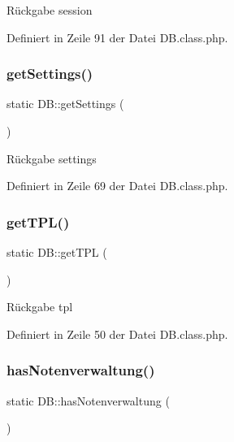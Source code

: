 \begin{DoxyReturn}{Rückgabe}
session 
\end{DoxyReturn}


Definiert in Zeile 91 der Datei D\+B.\+class.\+php.

\mbox{\label{class_d_b_a30c984e1dee257f1b9d3b62cbae0ac41}} 
\subsubsection{\texorpdfstring{get\+Settings()}{getSettings()}}
{\footnotesize\ttfamily static D\+B\+::get\+Settings (\begin{DoxyParamCaption}{ }\end{DoxyParamCaption})\hspace{0.3cm}{\ttfamily [static]}}

\begin{DoxyReturn}{Rückgabe}
settings 
\end{DoxyReturn}


Definiert in Zeile 69 der Datei D\+B.\+class.\+php.

\mbox{\label{class_d_b_a3b3f4c52a74bd43c8de64f37affdc13c}} 
\subsubsection{\texorpdfstring{get\+T\+P\+L()}{getTPL()}}
{\footnotesize\ttfamily static D\+B\+::get\+T\+PL (\begin{DoxyParamCaption}{ }\end{DoxyParamCaption})\hspace{0.3cm}{\ttfamily [static]}}

\begin{DoxyReturn}{Rückgabe}
tpl 
\end{DoxyReturn}


Definiert in Zeile 50 der Datei D\+B.\+class.\+php.

\mbox{\label{class_d_b_ac2a93cc21007d82274796aef19353bb8}} 
\subsubsection{\texorpdfstring{has\+Notenverwaltung()}{hasNotenverwaltung()}}
{\footnotesize\ttfamily static D\+B\+::has\+Notenverwaltung (\begin{DoxyParamCaption}{ }\end{DoxyParamCaption})\hspace{0.3cm}{\ttfamily [static]}}

